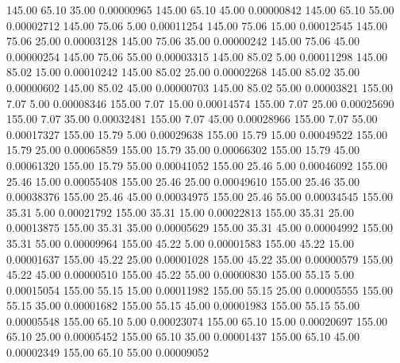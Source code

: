     145.00     65.10     35.00     0.00000965
    145.00     65.10     45.00     0.00000842
    145.00     65.10     55.00     0.00002712
    145.00     75.06      5.00     0.00011254
    145.00     75.06     15.00     0.00012545
    145.00     75.06     25.00     0.00003128
    145.00     75.06     35.00     0.00000242
    145.00     75.06     45.00     0.00000254
    145.00     75.06     55.00     0.00003315
    145.00     85.02      5.00     0.00011298
    145.00     85.02     15.00     0.00010242
    145.00     85.02     25.00     0.00002268
    145.00     85.02     35.00     0.00000602
    145.00     85.02     45.00     0.00000703
    145.00     85.02     55.00     0.00003821
    155.00      7.07      5.00     0.00008346
    155.00      7.07     15.00     0.00014574
    155.00      7.07     25.00     0.00025690
    155.00      7.07     35.00     0.00032481
    155.00      7.07     45.00     0.00028966
    155.00      7.07     55.00     0.00017327
    155.00     15.79      5.00     0.00029638
    155.00     15.79     15.00     0.00049522
    155.00     15.79     25.00     0.00065859
    155.00     15.79     35.00     0.00066302
    155.00     15.79     45.00     0.00061320
    155.00     15.79     55.00     0.00041052
    155.00     25.46      5.00     0.00046092
    155.00     25.46     15.00     0.00055408
    155.00     25.46     25.00     0.00049610
    155.00     25.46     35.00     0.00038376
    155.00     25.46     45.00     0.00034975
    155.00     25.46     55.00     0.00034545
    155.00     35.31      5.00     0.00021792
    155.00     35.31     15.00     0.00022813
    155.00     35.31     25.00     0.00013875
    155.00     35.31     35.00     0.00005629
    155.00     35.31     45.00     0.00004992
    155.00     35.31     55.00     0.00009964
    155.00     45.22      5.00     0.00001583
    155.00     45.22     15.00     0.00001637
    155.00     45.22     25.00     0.00001028
    155.00     45.22     35.00     0.00000579
    155.00     45.22     45.00     0.00000510
    155.00     45.22     55.00     0.00000830
    155.00     55.15      5.00     0.00015054
    155.00     55.15     15.00     0.00011982
    155.00     55.15     25.00     0.00005555
    155.00     55.15     35.00     0.00001682
    155.00     55.15     45.00     0.00001983
    155.00     55.15     55.00     0.00005548
    155.00     65.10      5.00     0.00023074
    155.00     65.10     15.00     0.00020697
    155.00     65.10     25.00     0.00005452
    155.00     65.10     35.00     0.00001437
    155.00     65.10     45.00     0.00002349
    155.00     65.10     55.00     0.00009052
